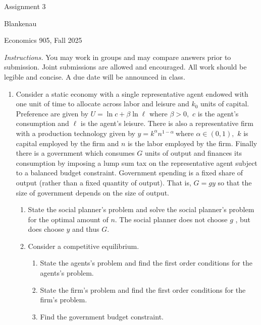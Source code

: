 \documentclass{article}
\begin{document}
\begin{center}
{\LARGE Assignment 3}
\end{center}

\noindent Blankenau

\noindent Economics 905, Fall 2025

\noindent \textit{Instructions.} You may work in groups and may compare
answers prior to submission. Joint submissions are allowed and encouraged.
All work should be legible and concise. A due date will be announced in
class.

\begin{enumerate}
\item Consider a static economy with a single representative agent endowed
with one unit of time to allocate across labor and leisure and $k_{0}$ units
of capital. Preference are given by $U=\ln c+\beta \ln \ell $ where $\beta
>0,$ $c$ is the agent's consumption and $\ell $ is the agent's leisure$.$
There is also a representative firm with a production technology given by $%
y=k^{\alpha }n^{1-\alpha }\ $where $\alpha \in \left( 0,1\right) ,$ $k$ is
capital employed by the firm and $n$ is the labor employed by the firm$.$
Finally there is a government which consumes $G$ units of output and
finances its consumption by imposing a lump sum tax on the representative
agent subject to a balanced budget constraint. Government spending is a
fixed share of output (rather than a fixed quantity of output). That is, $%
G=gy$ so that the size of government depends on the size of output.

\begin{enumerate}
\item State the social planner's problem and solve the social planner's
problem for the optimal amount of $n$. The social planner does not choose $g$%
, but does choose $y$ and thus $G$.

\item Consider a competitive equilibrium.

\begin{enumerate}
\item State the agents's problem and find the first order conditions for the
agents's problem.

\item State the firm's problem and find the first order conditions for the
firm's problem.

\item Find the government budget constraint.


\end{enumerate}
\end{enumerate}
\end{enumerate}
\end{document}
